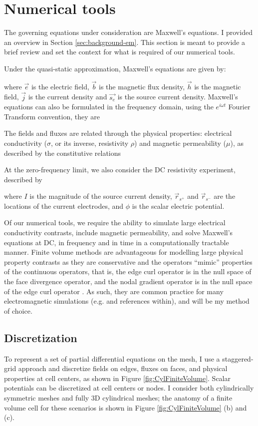 \section{Numerical tools}
\label{sec:numerical_tools}

The governing equations under consideration are Maxwell's equations. I provided an overview in Section \ref{sec:background-em}. This section is meant to provide a brief review and set the context for what is required of our numerical tools.

Under the quasi-static approximation, Maxwell's equations are given by:

where $\vec{e}$ is the electric field, $\vec{b}$ is the magnetic flux density, $\vec{h}$ is the magnetic field, $\vec{j}$ is the current density and $\vec{s_e}$ is the source current density. Maxwell's equations can also be formulated in the frequency domain, using the $e^{i \omega t}$ Fourier Transform convention, they are

The fields and fluxes are related through the physical properties: electrical conductivity ($\sigma$, or its inverse, resistivity $\rho$) and magnetic permeability ($\mu$), as described by the constitutive relations

At the zero-frequency limit, we also consider the DC resistivity experiment, described by

where $I$ is the magnitude of the source current density, $\vec{r}_{s^+}$ and $\vec{r}_{s^-}$ are the locations of the current electrodes, and $\phi$ is the scalar electric potential.

Of our numerical tools, we require the ability to simulate large electrical conductivity contrasts, include magnetic permeability, and solve Maxwell's equations at DC, in frequency and in time in a computationally tractable manner. Finite volume methods are advantageous for modelling large physical property contrasts as they are conservative and the operators ``mimic'' properties of the continuous operators, that is, the edge curl operator is in the null space of the face divergence operator, and the nodal gradient operator is in the null space of the edge curl operator \citep{Hyman1999}. As such, they are common practice for many electromagnetic simulations (e.g. \cite{Horesh2011, Haber2014, Jahandari2014} and references within), and will be my method of choice.
\subsection{Discretization}
To represent a set of partial differential equations on the mesh, I use a staggered-grid approach \citep{Yee1966} and discretize fields on edges, fluxes on faces, and physical properties at cell centers, as shown in Figure \ref{fig:CylFiniteVolume}. Scalar potentials can be discretized at cell centers or nodes. I consider both cylindrically symmetric meshes and fully 3D cylindrical meshes; the anatomy of a finite volume cell for these scenarios is shown in Figure \ref{fig:CylFiniteVolume} (b) and (c).



